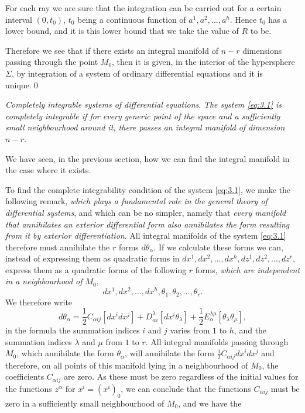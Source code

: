 For each ray we are sure that the integration can be carried out for a certain interval $(0,t_{0})$, $t_{0}$ being a continuous function of $a^{1},a^{2},\dots,a^{h}$. Hence $t_{0}$ has a lower bound, and it is this lower bound that we take the value of $R$ to be.

Therefore we see that if there exists an integral manifold of $n-r$ dimensions passing through the point $M_{0}$, then it is given, in the interior of the hypersphere $\Sigma$, by integration of a system of ordinary differential equations and it is unique.\qed

\vspace{12pt}\fsec \emph{Completely integrable systems of differential equations}. \emph{The system \eqref{eq:3.1} is completely integrable if for every generic point of the space and a sufficiently small neighbourhood around it, there passes an integral manifold of dimension $n-r$.}

We have seen, in the previous section, how we can find the integral manifold in the case where it exists.

To find the complete integrability condition of the system \eqref{eq:3.1}, we make the following remark, \emph{which plays a fundamental role in the general theory of differential systems}, and which can be no simpler, namely that \emph{every manifold that annihilates an exterior differential form also annihilates the form resulting from it by exterior differentiation}. All integral manifolds of the system \eqref{eq:3.1} therefore must annihilate the $r$ forms $d\theta_{\alpha}$. If we calculate these forms we can, instead of expressing them as quadratic forms in $dx^{1},dx^{2},\dots,dx^{h},dz^{1},dz^{2},\dots,dz^{r}$, express them as a quadratic forms of the following $r$ forms, \emph{which are independent in a neighbourhood of $M_{0}$},
\[
dx^{1},dx^{2},\dots,dx^{h},\theta_{1},\theta_{2},\dots,\theta_{r}.
\]
We therefore write
\begin{equation}
  \label{eq:3.3}
  d\theta_{\alpha}=\frac{1}{2}C_{\alpha ij}[dx^{i}dx^{j}]+D^{\lambda}_{\alpha i}[dx^{i}\theta_{\lambda}]+\frac{1}{2}E_{\alpha}^{\lambda\mu}[\theta_{\lambda}\theta_{\mu}],
\end{equation}
in the formula the summation indices $i$ and $j$ varies from $1$ to $h$, and the summation indices $\lambda$ and $\mu$ from $1$ to $r$. All integral manifolds passing through $M_{0}$, which annihilate the form $\theta_{\alpha}$, will annihilate the form $\tfrac{1}{2}C_{\alpha ij}dx^{i}dx^{j}$ and therefore, on all points of this manifold lying in a neighbourhood of $M_{0}$, the coefficients $C_{\alpha ij}$ are zero. As these must be zero regardless of the initial values for the functions $z^{\alpha}$ for $x^{i}=(x^{i})_{0}$, we can conclude that the functions $C_{\alpha ij}$ must be zero in a sufficiently small neighbourhood of $M_{0}$, and we have the

